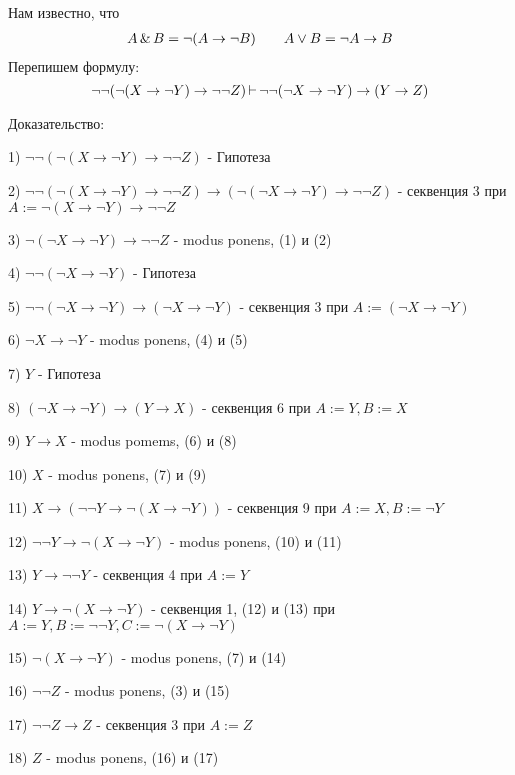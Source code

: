 Нам известно, что
\[
\begin{matrix}
    A\operatorname{\&} B = \lnot(A \to \lnot B) && A \lor B = \lnot A \to B
\end{matrix}
\] 
Перепишем формулу:
\[
\lnot\lnot(\lnot(X \to \lnot Y) \to \lnot\lnot Z) \operatorname{\vdash} \lnot\lnot(\lnot X \to \lnot Y) \to (Y \to Z)
\] 


Доказательство:

1) $\lnot\lnot(\lnot(X \to \lnot Y) \to \lnot\lnot Z)$ - Гипотеза

2) $\lnot\lnot(\lnot(X \to \lnot Y) \to \lnot\lnot Z) \to (\lnot(\lnot X \to \lnot Y) \to \lnot\lnot Z)$ -
секвенция 3 при $A := \lnot(X \to \lnot Y) \to \lnot\lnot Z$

3) $\lnot(\lnot X \to \lnot Y) \to \lnot\lnot Z$ - modus ponens, (1) и (2)

4) $\lnot\lnot(\lnot X \to \lnot Y)$ - Гипотеза

5) $\lnot\lnot(\lnot X \to \lnot Y) \to (\lnot X \to \lnot Y)$ - секвенция 3 при $A := 
(\lnot X \to \lnot Y)$

6) $\lnot X \to \lnot Y$ - modus ponens, (4) и (5)

7) $Y$ - Гипотеза

8) $(\lnot X \to \lnot Y) \to (Y \to X)$ - секвенция 6 при $ A:= Y, B := X$

9)  $Y \to X$ - modus pomems, (6) и (8)

10) $X$ - modus ponens, (7) и (9)

11)  $X \to (\lnot \lnot Y\to \lnot(X \to \lnot Y))$ - секвенция 9 при $A:=X, B:=\lnot Y$

12) $\lnot \lnot Y\to \lnot(X \to \lnot Y)$ - modus ponens, (10) и (11)

13)  $Y \to \lnot\lnot Y$ - секвенция 4 при $A:=Y$

14)  $Y \to \lnot(X \to \lnot Y)$ - секвенция 1, (12) и (13) при $A:=Y,B:=\lnot\lnot Y,
C:=\lnot(X \to \lnot Y)$

15) $\lnot(X \to \lnot Y)$ - modus ponens, (7) и (14)

16) $\lnot\lnot Z$ - modus ponens, (3) и (15)

17)  $\lnot\lnot Z \to Z$ - секвенция 3 при $A := Z$

18)  $Z$ - modus ponens, (16) и (17)


